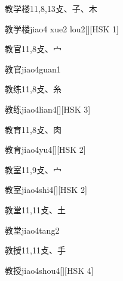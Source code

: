 \begin{entry}{教学楼}{11,8,13}{⽁、⼦、⽊}
  \begin{phonetics}{教学楼}{jiao4 xue2 lou2}[][HSK 1]
  \end{phonetics}
\end{entry}

\begin{entry}{教官}{11,8}{⽁、⼧}
  \begin{phonetics}{教官}{jiao4guan1}
  \end{phonetics}
\end{entry}

\begin{entry}{教练}{11,8}{⽁、⽷}
  \begin{phonetics}{教练}{jiao4lian4}[][HSK 3]
  \end{phonetics}
\end{entry}

\begin{entry}{教育}{11,8}{⽁、⾁}
  \begin{phonetics}{教育}{jiao4yu4}[][HSK 2]
  \end{phonetics}
\end{entry}

\begin{entry}{教室}{11,9}{⽁、⼧}
  \begin{phonetics}{教室}{jiao4shi4}[][HSK 2]
  \end{phonetics}
\end{entry}

\begin{entry}{教堂}{11,11}{⽁、⼟}
  \begin{phonetics}{教堂}{jiao4tang2}
  \end{phonetics}
\end{entry}

\begin{entry}{教授}{11,11}{⽁、⼿}
  \begin{phonetics}{教授}{jiao4shou4}[][HSK 4]
  \end{phonetics}
\end{entry}

